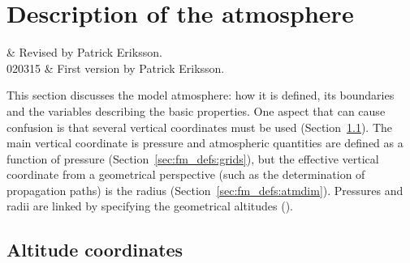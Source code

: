 \chapter{Description of the atmosphere}
 \label{sec:atmosphere}

 & Revised by Patrick Eriksson.\\ 
 020315 & First version by Patrick Eriksson.\\
\stophistory

\graphicspath{{Figs/atmosphere/}}

This section discusses the model atmosphere: how it is defined, its boundaries
and the variables describing the basic properties. One aspect that can cause
confusion is that several vertical coordinates must be used
(Section~\ref{sec:fm_defs:altitudes}). The main vertical coordinate is pressure
and atmospheric quantities are defined as a function of pressure
(Section~\ref{sec:fm_defs:grids}), but the effective vertical coordinate from a
geometrical perspective (such as the determination of propagation paths) is the
radius (Section~\ref{sec:fm_defs:atmdim}). Pressures and radii are linked by
specifying the geometrical altitudes ().


\section{Altitude coordinates}
\label{sec:fm_defs:altitudes}

